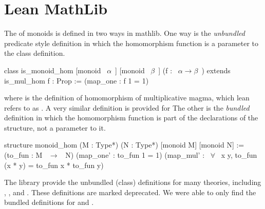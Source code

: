 \section{Lean MathLib}
The \href{https://github.com/leanprover-community/mathlib/blob/4bb8d4475f897c8997100d31fe84b33050444374/src/algebra/group/hom.lean}
{} 
of monoids is defined in two ways in mathlib. 
One way is the \emph{unbundled} predicate style definition in which the homomorphism function is a parameter to the class definition.  
\begin{leancode} 
class is_monoid_hom [monoid ~$\alpha$~] [monoid ~$\beta$~] (f : ~$\alpha \to \beta$~) 
   extends is_mul_hom f : Prop :=
    (map_one : f 1 = 1)
\end{leancode} 
where  is the definition of homomorphism of multiplicative magma, which lean refers to as . A very similar definition is provided for 
The other is the \emph{bundled} definition in which the homomorphism function is part of the declarations of the structure, not a parameter to it. 
\begin{leancode}     
structure monoid_hom (M : Type*) (N : Type*) [monoid M] [monoid N] :=
  (to_fun : M ~$\to$~ N)
  (map_one' : to_fun 1 = 1)
  (map_mul' : ~$\forall$~ x y, to_fun (x * y) = to_fun x * to_fun y)    
\end{leancode} 
The library provide the unbundled (class) definitions for many theories, including , , and . These definitions are marked deprecated. We were able to only find the bundled definitions for 
\href{https://github.com/leanprover-community/mathlib/blob/4bb8d4475f897c8997100d31fe84b33050444374/src/algebra/group/hom.lean}
{} and 
\href{https://github.com/leanprover-community/mathlib/blob/4bb8d4475f897c8997100d31fe84b33050444374/src/algebra/ring.lean}
{}. 

